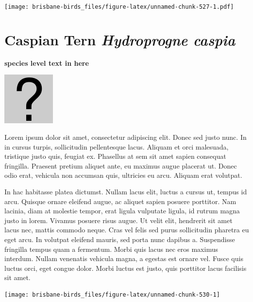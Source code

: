 \documentclass[]{book}
\let\origfigure\figure
\let\endorigfigure\endfigure
\renewenvironment{figure}[1][2] {
  \expandafter\origfigure\expandafter[H]
} {
  \endorigfigure
}
\begin{document}
\begin{figure}
\centering
\texttt{[image: brisbane-birds\_files/figure-latex/unnamed-chunk-527-1.pdf]}
\caption{\label{fig:unnamed-chunk-527}insert figure caption}
\end{figure}

\section{\texorpdfstring{Caspian Tern \emph{Hydroprogne
caspia}}{Caspian Tern Hydroprogne caspia}}\label{caspian-tern-hydroprogne-caspia}

\textbf{species level text in here}

\begin{figure}
\centering
\includegraphics{assets/missing.png}
\caption{No image for species}
\end{figure}

Lorem ipsum dolor sit amet, consectetur adipiscing elit. Donec sed justo
nunc. In in cursus turpis, sollicitudin pellentesque lacus. Aliquam et
orci malesuada, tristique justo quis, feugiat ex. Phasellus at sem sit
amet sapien consequat fringilla. Praesent pretium aliquet ante, eu
maximus augue placerat ut. Donec odio erat, vehicula non accumsan quis,
ultricies eu arcu. Aliquam erat volutpat.

In hac habitasse platea dictumst. Nullam lacus elit, luctus a cursus ut,
tempus id arcu. Quisque ornare eleifend augue, ac aliquet sapien posuere
porttitor. Nam lacinia, diam at molestie tempor, erat ligula vulputate
ligula, id rutrum magna justo in lorem. Vivamus posuere risus augue. Ut
velit elit, hendrerit sit amet lacus nec, mattis commodo neque. Cras vel
felis sed purus sollicitudin pharetra eu eget arcu. In volutpat eleifend
mauris, sed porta nunc dapibus a. Suspendisse fringilla tempus quam a
fermentum. Morbi quis lacus nec eros maximus interdum. Nullam venenatis
vehicula magna, a egestas est ornare vel. Fusce quis luctus orci, eget
congue dolor. Morbi luctus est justo, quis porttitor lacus facilisis sit
amet.

\begin{figure}
\texttt{[image: brisbane-birds\_files/figure-latex/unnamed-chunk-530-1]} \caption{insert figure caption}\label{fig:unnamed-chunk-530}
\end{figure}
\end{document}
